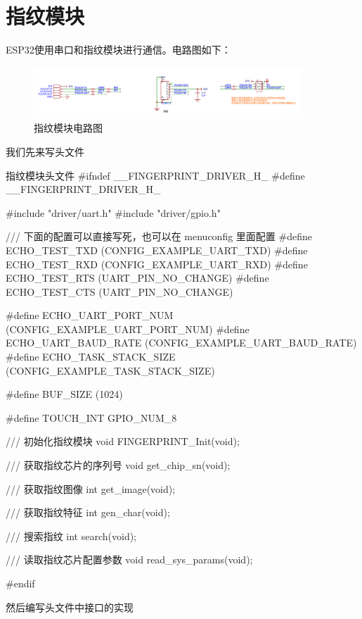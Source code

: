 \documentclass[lang=cn,newtx,10pt,scheme=chinese]{elegantbook}
\begin{document}
\chapter{指纹模块}

ESP32使用串口和指纹模块进行通信。电路图如下：

\begin{figure}[!htb]
\centering
\includegraphics[width=0.9\textwidth]{fingerprint.png}
\caption{指纹模块电路图}
\end{figure}

我们先来写头文件

\begin{mycode}{指纹模块头文件}
#ifndef __FINGERPRINT_DRIVER_H_
#define __FINGERPRINT_DRIVER_H_

#include "driver/uart.h"
#include "driver/gpio.h"

/// 下面的配置可以直接写死，也可以在 menuconfig 里面配置
#define ECHO_TEST_TXD (CONFIG_EXAMPLE_UART_TXD)
#define ECHO_TEST_RXD (CONFIG_EXAMPLE_UART_RXD)
#define ECHO_TEST_RTS (UART_PIN_NO_CHANGE)
#define ECHO_TEST_CTS (UART_PIN_NO_CHANGE)

#define ECHO_UART_PORT_NUM (CONFIG_EXAMPLE_UART_PORT_NUM)
#define ECHO_UART_BAUD_RATE (CONFIG_EXAMPLE_UART_BAUD_RATE)
#define ECHO_TASK_STACK_SIZE (CONFIG_EXAMPLE_TASK_STACK_SIZE)

#define BUF_SIZE (1024)

#define TOUCH_INT GPIO_NUM_8

/// 初始化指纹模块
void FINGERPRINT_Init(void);

/// 获取指纹芯片的序列号
void get_chip_sn(void);

/// 获取指纹图像
int get_image(void);

/// 获取指纹特征
int gen_char(void);

/// 搜索指纹
int search(void);

/// 读取指纹芯片配置参数
void read_sys_params(void);

#endif
\end{mycode}

然后编写头文件中接口的实现
\end{document}
